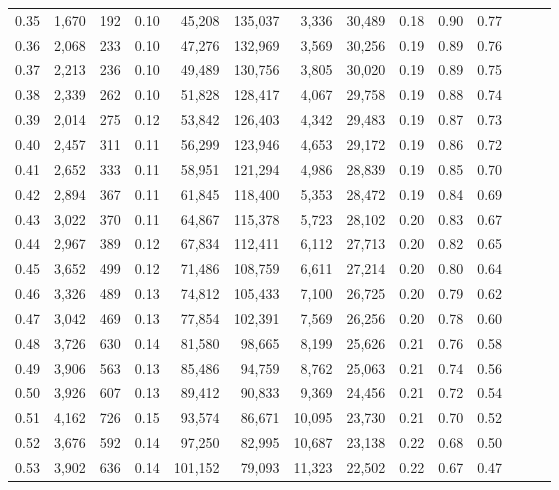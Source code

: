 \begin{tabular}{rrrrrrrrrrrrrr}
0.35 &  1,670 &  192 &  0.10 &   45,208 &  135,037 &   3,336 &  30,489 &  0.18 &  0.90 &      0.77 \\
0.36 &  2,068 &  233 &  0.10 &   47,276 &  132,969 &   3,569 &  30,256 &  0.19 &  0.89 &      0.76 \\
0.37 &  2,213 &  236 &  0.10 &   49,489 &  130,756 &   3,805 &  30,020 &  0.19 &  0.89 &      0.75 \\
0.38 &  2,339 &  262 &  0.10 &   51,828 &  128,417 &   4,067 &  29,758 &  0.19 &  0.88 &      0.74 \\
0.39 &  2,014 &  275 &  0.12 &   53,842 &  126,403 &   4,342 &  29,483 &  0.19 &  0.87 &      0.73 \\
0.40 &  2,457 &  311 &  0.11 &   56,299 &  123,946 &   4,653 &  29,172 &  0.19 &  0.86 &      0.72 \\
0.41 &  2,652 &  333 &  0.11 &   58,951 &  121,294 &   4,986 &  28,839 &  0.19 &  0.85 &      0.70 \\
0.42 &  2,894 &  367 &  0.11 &   61,845 &  118,400 &   5,353 &  28,472 &  0.19 &  0.84 &      0.69 \\
0.43 &  3,022 &  370 &  0.11 &   64,867 &  115,378 &   5,723 &  28,102 &  0.20 &  0.83 &      0.67 \\
0.44 &  2,967 &  389 &  0.12 &   67,834 &  112,411 &   6,112 &  27,713 &  0.20 &  0.82 &      0.65 \\
0.45 &  3,652 &  499 &  0.12 &   71,486 &  108,759 &   6,611 &  27,214 &  0.20 &  0.80 &      0.64 \\
0.46 &  3,326 &  489 &  0.13 &   74,812 &  105,433 &   7,100 &  26,725 &  0.20 &  0.79 &      0.62 \\
0.47 &  3,042 &  469 &  0.13 &   77,854 &  102,391 &   7,569 &  26,256 &  0.20 &  0.78 &      0.60 \\
0.48 &  3,726 &  630 &  0.14 &   81,580 &   98,665 &   8,199 &  25,626 &  0.21 &  0.76 &      0.58 \\
0.49 &  3,906 &  563 &  0.13 &   85,486 &   94,759 &   8,762 &  25,063 &  0.21 &  0.74 &      0.56 \\
0.50 &  3,926 &  607 &  0.13 &   89,412 &   90,833 &   9,369 &  24,456 &  0.21 &  0.72 &      0.54 \\
0.51 &  4,162 &  726 &  0.15 &   93,574 &   86,671 &  10,095 &  23,730 &  0.21 &  0.70 &      0.52 \\
0.52 &  3,676 &  592 &  0.14 &   97,250 &   82,995 &  10,687 &  23,138 &  0.22 &  0.68 &      0.50 \\
0.53 &  3,902 &  636 &  0.14 &  101,152 &   79,093 &  11,323 &  22,502 &  0.22 &  0.67 &      0.47 \\

\end{tabular}
